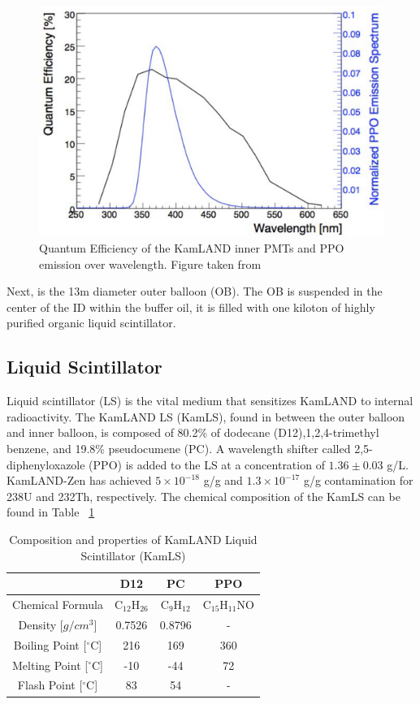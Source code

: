 \begin{figure}[htb]
	\centering
	\includegraphics[scale=0.35]{qe_PPO_emission.png}
	\caption{Quantum Efficiency of the KamLAND inner PMTs and PPO emission over wavelength. Figure taken from \cite{mastuda_phd}}
	\label{fig:qe_emission}
\end{figure}

Next, is the 13m diameter outer balloon (OB). The OB is suspended in the center of the ID within the buffer oil, it is filled with one kiloton of highly purified organic liquid scintillator.

\subsection{Liquid Scintillator}
Liquid scintillator (LS) is the vital medium that sensitizes KamLAND to internal radioactivity. The KamLAND LS (KamLS), found in between the outer balloon and inner balloon, is composed of 80.2\% of dodecane (D12),1,2,4-trimethyl benzene, and 19.8\% pseudocumene (PC). A wavelength shifter called 2,5-diphenyloxazole (PPO) is added to the LS at a concentration of $1.36 \pm 0.03$ g/L. KamLAND-Zen has achieved $5 \times 10^{-18}$ g/g and $1.3 \times 10^{-17}$ g/g contamination for 238U and 232Th, respectively. The chemical composition of the KamLS can be found in Table ~\ref{tbl:kamls}

\begin{table}[h]
	\centering
	\renewcommand{\arraystretch}{1.2}
	\begin{tabular}{c|ccc}
		\hline
		& D12 & PC & PPO \\
		\hline
		Chemical Formula & C$_{12}$H$_{26}$ & C$_9$H$_{12}$ & C$_{15}$H$_{11}$NO \\
		Density [$g/cm^3$] & 0.7526 & 0.8796 & -\\
		Boiling Point [$^\circ$C] & 216 & 169 & 360 \\
		Melting Point [$^\circ$C] & -10 & -44 & 72 \\
		Flash Point [$^\circ$C] & 83 & 54 & - \\ \hline
	\end{tabular}
	\caption{Composition and properties of KamLAND Liquid Scintillator (KamLS)}
	\label{tbl:kamls}
\end{table}

